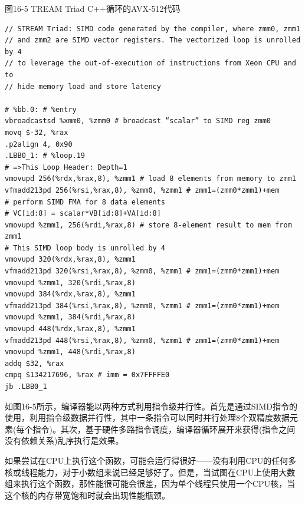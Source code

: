 \hspace*{\fill} \par %
图16-5 TREAM Triad C++循环的AVX-512代码
\begin{lstlisting}[caption={}]
// STREAM Triad: SIMD code generated by the compiler, where zmm0, zmm1 
// and zmm2 are SIMD vector registers. The vectorized loop is unrolled by 4
// to leverage the out-of-execution of instructions from Xeon CPU and to
// hide memory load and store latency 

# %bb.0: # %entry
vbroadcastsd %xmm0, %zmm0 # broadcast “scalar” to SIMD reg zmm0
movq $-32, %rax
.p2align 4, 0x90
.LBB0_1: # %loop.19
# =>This Loop Header: Depth=1
vmovupd 256(%rdx,%rax,8), %zmm1 # load 8 elements from memory to zmm1 
vfmadd213pd 256(%rsi,%rax,8), %zmm0, %zmm1 # zmm1=(zmm0*zmm1)+mem
# perform SIMD FMA for 8 data elements 
# VC[id:8] = scalar*VB[id:8]+VA[id:8] 
vmovupd %zmm1, 256(%rdi,%rax,8) # store 8-element result to mem from zmm1 
# This SIMD loop body is unrolled by 4
vmovupd 320(%rdx,%rax,8), %zmm1
vfmadd213pd 320(%rsi,%rax,8), %zmm0, %zmm1 # zmm1=(zmm0*zmm1)+mem
vmovupd %zmm1, 320(%rdi,%rax,8)
vmovupd 384(%rdx,%rax,8), %zmm1
vfmadd213pd 384(%rsi,%rax,8), %zmm0, %zmm1 # zmm1=(zmm0*zmm1)+mem
vmovupd %zmm1, 384(%rdi,%rax,8)
vmovupd 448(%rdx,%rax,8), %zmm1
vfmadd213pd 448(%rsi,%rax,8), %zmm0, %zmm1 # zmm1=(zmm0*zmm1)+mem
vmovupd %zmm1, 448(%rdi,%rax,8)
addq $32, %rax
cmpq $134217696, %rax # imm = 0x7FFFFE0
jb .LBB0_1
\end{lstlisting}

如图16-5所示，编译器能以两种方式利用指令级并行性。首先是通过SIMD指令的使用，利用指令级数据并行性，其中一条指令可以同时并行处理8个双精度数据元素(每个指令)。其次，基于硬件多路指令调度，编译器循环展开来获得(指令之间没有依赖关系)乱序执行是效果。\par

如果尝试在CPU上执行这个函数，可能会运行得很好——没有利用CPU的任何多核或线程能力，对于小数组来说已经足够好了。但是，当试图在CPU上使用大数组来执行这个函数，那性能很可能会很差，因为单个线程只使用一个CPU核，当这个核的内存带宽饱和时就会出现性能瓶颈。\par

























































